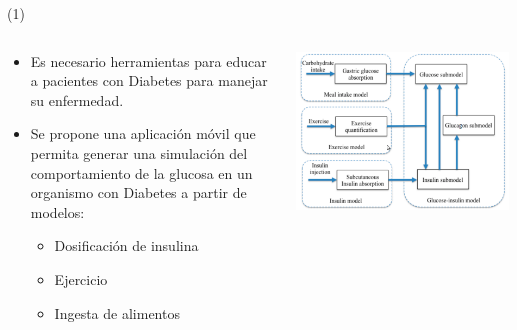 



\begin{frame}{ \footnotemark (1)}

\begin{columns}
\begin{column}{0.5\textwidth}
	\begin{itemize}
\item Es necesario herramientas para educar a pacientes con Diabetes para manejar su enfermedad.
\item Se propone una aplicación móvil que permita generar una simulación del comportamiento de la glucosa en un organismo con Diabetes a partir de modelos:
	\begin{itemize}
		\item Dosificación de insulina
		\item Ejercicio
		\item Ingesta de alimentos
	\end{itemize}
	\end{itemize}
\end{column}
\begin{column}{0.5\textwidth}
\begin{center}
     \includegraphics[width=0.99\textwidth]{Figs/Diabetes1}
     \end{center}
\end{column}
\end{columns}
\setcounter{footnote}{0}
\end{frame}

